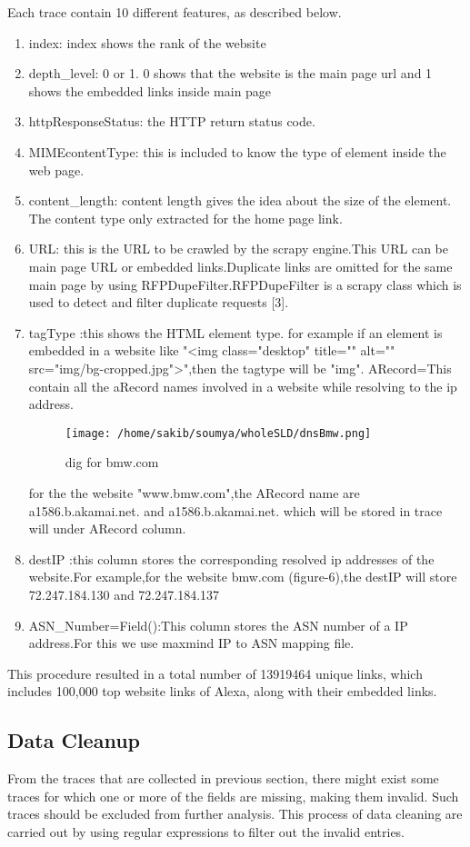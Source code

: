 Each trace contain 10 different features, as described below.
\begin{enumerate}
   \item index: index shows the rank of the website
	\item depth\_level: 0 or 1.
			  0 shows that the website is the main page url and 1 shows the embedded links inside main page 
\item httpResponseStatus: the HTTP return status code.
\item MIMEcontentType: this is included to know the type of element inside the web page.
\item content\_length: content length gives the idea about the size of the element. The content type only extracted for the home page link.
\item URL: this is the URL to be crawled by the scrapy engine.This URL can be main page URL or embedded links.Duplicate links are omitted for the same main page by using RFPDupeFilter.RFPDupeFilter is a scrapy class which is used to detect and filter duplicate requests [3].
\item tagType :this shows the HTML element type.
		for example if an element is embedded in a website like "<img class="desktop" title="" alt="" src="img/bg-cropped.jpg">",then the tagtype will be "img". 
ARecord=This contain all the aRecord names involved in a website while resolving to the ip address.
\begin{figure}[h]
\texttt{[image: /home/sakib/soumya/wholeSLD/dnsBmw.png]}
\centering
\caption{dig for bmw.com}
\end{figure}
for the the website "www.bmw.com",the ARecord name are a1586.b.akamai.net. and a1586.b.akamai.net. which will be stored in trace will under ARecord column.
\item destIP :this column stores the corresponding resolved ip addresses of the website.For example,for the website bmw.com (figure-6),the destIP will store 72.247.184.130 and 72.247.184.137
\item ASN\_Number=Field():This column stores the ASN number of a IP address.For this we use maxmind IP to ASN mapping file.
    \end{enumerate}
    
This procedure resulted in a total number of 13919464 unique links, which includes 100,000 top website links of Alexa, along with their embedded links.

\subsection{Data Cleanup}
From the traces that are collected in previous section, there might exist some traces for which one or more of the fields are missing, making them invalid. Such traces should be excluded from further analysis. This process of data cleaning are carried out by using regular expressions to filter out the invalid entries.

